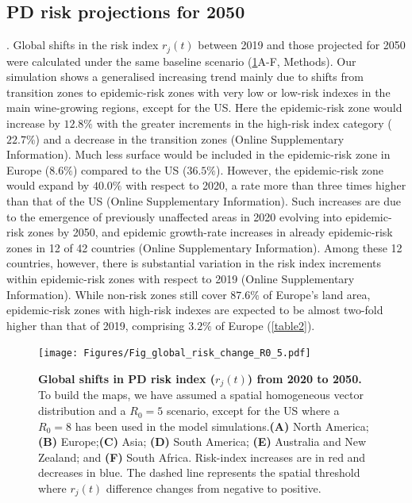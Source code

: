     \subsection{PD risk projections for 2050}. Global shifts in the risk
    index
$r_j(t)$ between 2019 and those projected for 2050 were calculated under the
    same baseline scenario (\cref{fig5}A-F, Methods). Our simulation shows a
    generalised increasing trend mainly due to shifts from transition zones to
    epidemic-risk zones with very low or low-risk indexes in the main
    wine-growing
    regions, except for the US. Here the epidemic-risk zone would increase by
$12.8\%$ with the greater increments in the high-risk index category ($22.7\%$)
    and a decrease in the transition zones (Online Supplementary Information).
    Much
    less surface
    would be included in the epidemic-risk zone in Europe ($8.6\%$) compared to
    the
    US ($36.5\%$). However, the epidemic-risk zone would expand by $40.0\%$
    with
    respect to 2020, a rate more than three times higher than that of the US
    (Online Supplementary Information). Such increases are due to the emergence
    of
    previously
    unaffected areas in 2020 evolving into epidemic-risk zones by 2050, and
    epidemic growth-rate increases in already epidemic-risk zones in 12 of 42
    countries (Online Supplementary Information). Among these 12 countries,
    however,
    there is
    substantial variation in the risk index increments within epidemic-risk
    zones
    with respect to 2019 (Online Supplementary Information). While non-risk
    zones
    still cover
$87.6\%$ of Europe's land area, epidemic-risk zones with high-risk indexes are
    expected to be almost two-fold higher than that of 2019, comprising $3.2\%$
    of
    Europe (\cref{table2}). \\

    \begin{figure}[b!]
        \centering

        \texttt{[image: Figures/Fig\_global\_risk\_change\_R0\_5.pdf]}
        \caption{\textbf{Global shifts in PD risk index ($r_j(t)$) from 2020 to
                2050.} To build the maps, we have assumed a spatial homogeneous
            vector
            distribution and a $R_0=5$ scenario, except for the US where a
            $R_0=8$ has been
            used in the model simulations.\textbf{(A)} North
            America;\textbf{(B)}
            Europe;\textbf{(C)} Asia; \textbf{(D)} South America; \textbf{(E)}
            Australia
            and New Zealand; and \textbf{(F)} South Africa. Risk-index
            increases are in red
            and decreases in blue. The dashed line represents the spatial
            threshold where
            $r_j(t)$ difference changes from negative to positive.}
        \label{fig5}
    \end{figure}

